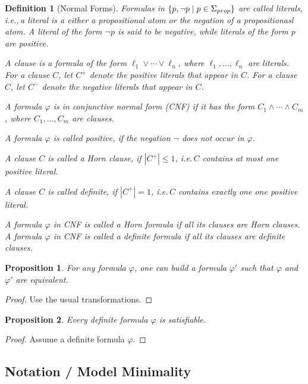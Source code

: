 \documentclass[12pt]{extarticle}
\newtheorem{definition}{Definition}
\newtheorem{proposition}{Proposition}
\begin{document}
\begin{definition}[Normal Forms]
  Formulas in $\{p,\neg p\mid p\in \Sigma_{prop}\}$ are called
  \emph{literals}, i.e.,\,a literal is a either a propositional atom
  or the negation of a propositionasl atom. A literal of the form
  $\neg p$ is said to be \emph{negative}, while literals of the form
  $p$ are \emph{positive}.

  A \emph{clause} is a formula of the form
  $\ell_1\lor \cdots\lor \ell_n$, where $\ell_1,\ldots,\ell_n$ are
  literals. For a clause $C$, let $C^{+}$ denote the positive literals
  that appear in $C$. For a clause $C$, let $C^{-}$ denote the
  negative literals that appear in $C$.

  A formula $\varphi$ is in \emph{conjunctive normal form (CNF)} if it
  has the form $C_1\land \cdots \land C_m$, where $C_1,\ldots,C_m$ are
  clauses.

  A formula $\varphi$ is called \emph{positive}, if the negation
  $\neg$ does not occur in $\varphi$.

  A clause $C$ is called a \emph{Horn clause}, if $|C^{+}|\leq 1$,
  i.e.\,$C$ contains at most one positive literal.

  A clause $C$ is called \emph{definite}, if $|C^{+}|= 1$, i.e.\,$C$
  contains exactly one one positive literal.

  A formula $\varphi$ in CNF is called a \emph{Horn formula} if all
  its clauses are Horn clauses.  A formula $\varphi$ in CNF is called
  a \emph{definite formula} if all its clauses are definite clauses.
\end{definition}

\begin{proposition}
  For any formula $\varphi$, one can build a formula $\varphi'$ such
  that $\varphi$ and $\varphi'$ are equivalent.
\end{proposition}
\begin{proof}
  Use the usual transformations.
\end{proof}


\begin{proposition}
  Every definite formula $\varphi$ is satisfiable.
\end{proposition}
\begin{proof}
  Assume a definite formula $\varphi$. 
\end{proof}
 
\subsection{Notation / Model Minimality}
\end{document}
